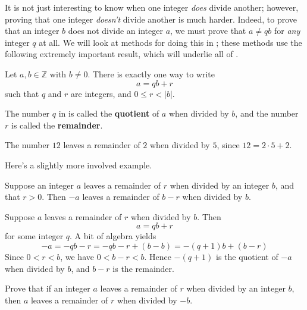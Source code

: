 It is not just interesting to know when one integer \textit{does} divide another; however, proving that one integer \textit{doesn't} divide another is much harder. Indeed, to prove that an integer $b$ does not divide an integer $a$, we must prove that $a \ne qb$ for \textit{any} integer $q$ at all. We will look at methods for doing this in ; these methods use the following extremely important result, which will underlie all of .

\begin{theorem}
\label{thmDivisionPreliminary}
Let $a,b \in \mathbb{Z}$ with $b \ne 0$. There is exactly one way to write
\[ a = qb + r \]
such that $q$ and $r$ are integers, and $0 \le r < |b|$.
\end{theorem}

The number $q$ in  is called the \textbf{quotient} of $a$ when divided by $b$, and the number $r$ is called the \textbf{remainder}.

\begin{example}
The number $12$ leaves a remainder of $2$ when divided by $5$, since $12 = 2 \cdot 5 + 2$.
\end{example}

Here's a slightly more involved example.

\begin{proposition}
Suppose an integer $a$ leaves a remainder of $r$ when divided by an integer $b$, and that $r>0$. Then $-a$ leaves a remainder of $b-r$ when divided by $b$.
\end{proposition}

\begin{cproof}
Suppose $a$ leaves a remainder of $r$ when divided by $b$. Then
\[ a=qb+r \]
for some integer $q$. A bit of algebra yields
\[ -a = -qb-r = -qb-r+(b-b) = -(q+1)b + (b-r) \]
Since $0<r<b$, we have $0<b-r<b$. Hence $-(q+1)$ is the quotient of $-a$ when divided by $b$, and $b-r$ is the remainder.
\end{cproof}

\begin{exercise}
Prove that if an integer $a$ leaves a remainder of $r$ when divided by an integer $b$, then $a$ leaves a remainder of $r$ when divided by $-b$.
\end{exercise}

